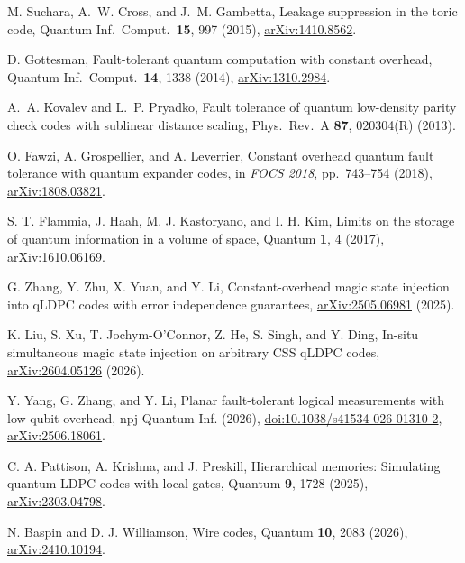 M. Suchara, A.~W. Cross, and J.~M. Gambetta, Leakage suppression in the toric code, Quantum Inf.\ Comput.\ \textbf{15}, 997 (2015), \href{https://arxiv.org/abs/1410.8562}{arXiv:1410.8562}.

D. Gottesman, Fault-tolerant quantum computation with constant overhead, Quantum Inf.\ Comput.\ \textbf{14}, 1338 (2014), \href{https://arxiv.org/abs/1310.2984}{arXiv:1310.2984}.

A.~A. Kovalev and L.~P. Pryadko, Fault tolerance of quantum low-density parity check codes with sublinear distance scaling, Phys.\ Rev.\ A \textbf{87}, 020304(R) (2013).

O. Fawzi, A. Grospellier, and A. Leverrier, Constant overhead quantum fault tolerance with quantum expander codes, in \emph{FOCS 2018}, pp.\ 743--754 (2018), \href{https://arxiv.org/abs/1808.03821}{arXiv:1808.03821}.

S. T. Flammia, J. Haah, M. J. Kastoryano, and I. H. Kim, Limits on the storage of quantum information in a volume of space, Quantum \textbf{1}, 4 (2017), \href{https://arxiv.org/abs/1610.06169}{arXiv:1610.06169}.

G. Zhang, Y. Zhu, X. Yuan, and Y. Li, Constant-overhead magic state injection into qLDPC codes with error independence guarantees, \href{https://arxiv.org/abs/2505.06981}{arXiv:2505.06981} (2025).

K. Liu, S. Xu, T. Jochym-O'Connor, Z. He, S. Singh, and Y. Ding, In-situ simultaneous magic state injection on arbitrary CSS qLDPC codes, \href{https://arxiv.org/abs/2604.05126}{arXiv:2604.05126} (2026).

Y. Yang, G. Zhang, and Y. Li, Planar fault-tolerant logical measurements with low qubit overhead, npj Quantum Inf. (2026), \href{https://doi.org/10.1038/s41534-026-01310-2}{doi:10.1038/s41534-026-01310-2}, \href{https://arxiv.org/abs/2506.18061}{arXiv:2506.18061}.

C. A. Pattison, A. Krishna, and J. Preskill, Hierarchical memories: Simulating quantum LDPC codes with local gates, Quantum \textbf{9}, 1728 (2025), \href{https://arxiv.org/abs/2303.04798}{arXiv:2303.04798}.

N. Baspin and D. J. Williamson, Wire codes, Quantum \textbf{10}, 2083 (2026), \href{https://arxiv.org/abs/2410.10194}{arXiv:2410.10194}.

